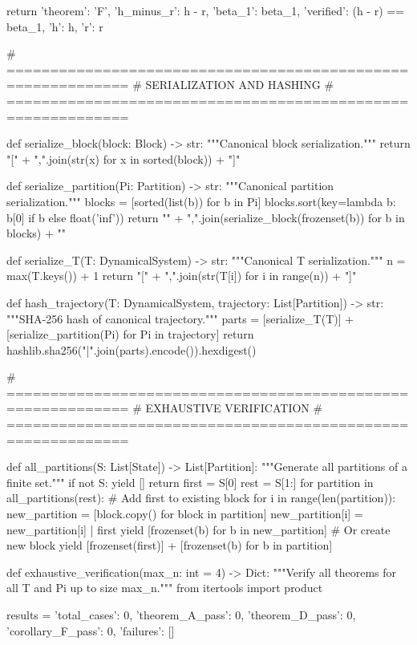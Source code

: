     return {
        'theorem': 'F',
        'h_minus_r': h - r,
        'beta_1': beta_1,
        'verified': (h - r) == beta_1,
        'h': h,
        'r': r
    }

# ============================================================
# SERIALIZATION AND HASHING
# ============================================================

def serialize_block(block: Block) -> str:
    """Canonical block serialization."""
    return "[" + ",".join(str(x) for x in sorted(block)) + "]"

def serialize_partition(Pi: Partition) -> str:
    """Canonical partition serialization."""
    blocks = [sorted(list(b)) for b in Pi]
    blocks.sort(key=lambda b: b[0] if b else float('inf'))
    return "{" + ",".join(serialize_block(frozenset(b)) for b in blocks) + "}"

def serialize_T(T: DynamicalSystem) -> str:
    """Canonical T serialization."""
    n = max(T.keys()) + 1
    return "[" + ",".join(str(T[i]) for i in range(n)) + "]"

def hash_trajectory(T: DynamicalSystem, trajectory: List[Partition]) -> str:
    """SHA-256 hash of canonical trajectory."""
    parts = [serialize_T(T)] + [serialize_partition(Pi) for Pi in trajectory]
    return hashlib.sha256("|".join(parts).encode()).hexdigest()

# ============================================================
# EXHAUSTIVE VERIFICATION
# ============================================================

def all_partitions(S: List[State]) -> List[Partition]:
    """Generate all partitions of a finite set."""
    if not S:
        yield []
        return
    first = S[0]
    rest = S[1:]
    for partition in all_partitions(rest):
        # Add first to existing block
        for i in range(len(partition)):
            new_partition = [block.copy() for block in partition]
            new_partition[i] = new_partition[i] | {first}
            yield [frozenset(b) for b in new_partition]
        # Or create new block
        yield [frozenset({first})] + [frozenset(b) for b in partition]

def exhaustive_verification(max_n: int = 4) -> Dict:
    """Verify all theorems for all T and Pi up to size max_n."""
    from itertools import product
    
    results = {
        'total_cases': 0,
        'theorem_A_pass': 0,
        'theorem_D_pass': 0,
        'corollary_F_pass': 0,
        'failures': []
    }
    
